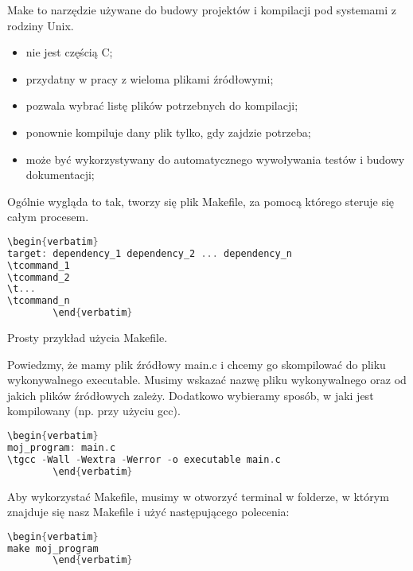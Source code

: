 \documentclass[notheorems, aspectratio=54]{beamer}
\begin{document}
\begin{frame}
	Make to narzędzie używane do budowy projektów i kompilacji pod systemami z rodziny Unix.
	
	\begin{itemize}
		\item nie jest częścią C;
		\item przydatny w pracy z wieloma plikami źródłowymi;
		\item pozwala wybrać listę plików potrzebnych do kompilacji;
		\item ponownie kompiluje dany plik tylko, gdy zajdzie potrzeba;
		\item może być wykorzystywany do automatycznego wywoływania testów i budowy dokumentacji;
	\end{itemize}
	
	Ogólnie wygląda to tak, tworzy się plik Makefile, za pomocą którego steruje się całym procesem.
	
	\begin{lstlisting}[language=C++]
\begin{verbatim}
target: dependency_1 dependency_2 ... dependency_n
\tcommand_1
\tcommand_2
\t...
\tcommand_n
		\end{verbatim}
	\end{lstlisting}
	
\end{frame}

\begin{frame}
	
	Prosty przykład użycia Makefile.
	
	Powiedzmy, że mamy plik źródłowy main.c i chcemy go skompilować do pliku wykonywalnego executable.
	Musimy wskazać nazwę pliku wykonywalnego oraz od jakich plików źródłowych zależy. Dodatkowo
	wybieramy sposób, w jaki jest kompilowany (np. przy użyciu gcc).
	
	\begin{lstlisting}[language=C++]
\begin{verbatim}
moj_program: main.c
\tgcc -Wall -Wextra -Werror -o executable main.c
		\end{verbatim}
	\end{lstlisting}
	
	Aby wykorzystać Makefile, musimy w otworzyć terminal w folderze, w którym znajduje się nasz
	Makefile i użyć następującego polecenia:
	
	\begin{lstlisting}[language=C++]
\begin{verbatim}
make moj_program
		\end{verbatim}
	\end{lstlisting}
	
\end{frame}
\end{document}
